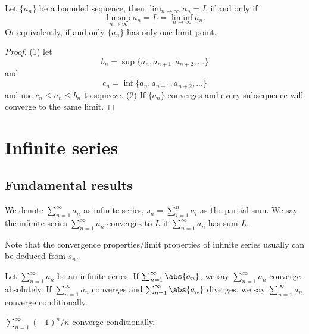 \begin{refsection}
\begin{theorem}
Let $\{a_n\}$ be a bounded sequence, then $\lim_{n\to \infty} a_n = L$ if and only if 
$$\limsup_{n\rightarrow \infty}  a_n = L = \liminf_{n\rightarrow \infty} a_n.$$
Or equivalently, if and only $\{a_n\}$ has only one limit point.
\end{theorem}
\begin{proof}
(1) let
$$b_n = \sup \{a_n,a_{n+1},a_{n+2},...\}$$
and
$$c_n = \inf \{a_n,a_{n+1},a_{n+2},...\}$$
and use $c_n\leq a_n \leq b_n$ to squeeze. (2) If $\{a_n\}$ converges and every subsequence will converge to the same limit.	
\end{proof}



\section{Infinite series}
\subsection{Fundamental results}
\begin{definition}\cite{johnsonbaugh2010foundations}
We denote $\sum_{n=1}^\infty a_n$ as infinite series, $s_n=\sum_{i=1}^n a_i$ as the partial sum. We say the infinite series $\sum_{n=1}^\infty a_n$ converges to $L$ if $\sum_{n=1}^\infty a_n$ has sum $L$.
\end{definition}
\begin{remark}
Note that the convergence properties/limit properties of infinite series usually can be deduced from $s_n$.
\end{remark}

\begin{definition}
	Let $\sum_{n=1}^\infty a_n$ be an infinite series. If $\sum_{n=1}^\infty \abs{a_n}$, we say $\sum_{n=1}^\infty a_n$ converge absolutely. If $\sum_{n=1}^\infty a_n$ converges and $\sum_{n=1}^\infty \abs{a_n}$ diverges, we say $\sum_{n=1}^\infty a_n$ converge conditionally.  
\end{definition}

\begin{example}
	$\sum_{n=1}^\infty (-1)^n/n$ converge conditionally.	
\end{example}


\end{refsection}
